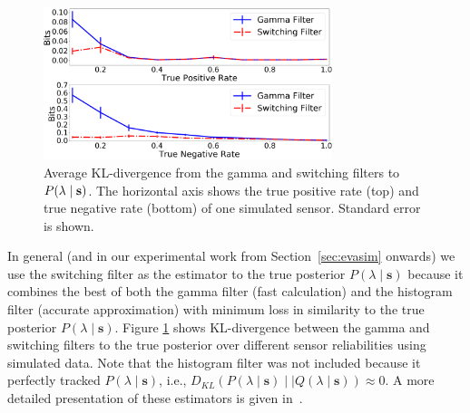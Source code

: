\begin{figure}[t!]
	\centering
	\includegraphics[width=0.75\textwidth]{./figures/kl_div_tpr_tnr_var.png}
	\caption{Average KL-divergence from the gamma and switching filters to $P(\lambda \mid \protect\mathbf{s})$. The horizontal axis shows the true positive rate (top) and true negative rate (bottom) of one simulated sensor. Standard error is shown.} 
	\label{fig:kl_div_tpr_tnr_var}
	\vspace{-20pt}
\end{figure}

In general (and in our experimental work from Section~\ref{sec:evasim} onwards) we use the switching filter as the estimator to the true posterior $P(\lambda \mid \mathbf{s})$ because it combines the best of both the gamma filter (fast calculation) and the histogram filter (accurate approximation) with minimum loss in similarity to the true posterior $P(\lambda \mid \mathbf{s})$. Figure \ref{fig:kl_div_tpr_tnr_var} shows KL-divergence between the gamma and switching filters to the true posterior over different sensor reliabilities using simulated data. Note that the histogram filter was not included because it perfectly tracked $P(\lambda \mid \mathbf{s})$, i.e., $D_{KL}(P(\lambda \mid \mathbf{s}) \mid \mid Q(\lambda \mid \mathbf{s})) \approx 0$. A more detailed presentation of these estimators is given in~\cite{jovan18a}.